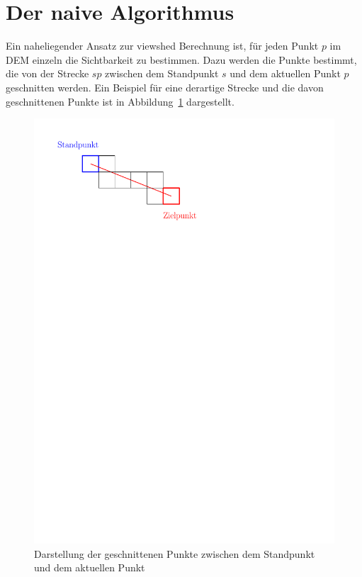 \section{Der naive Algorithmus}
Ein naheliegender Ansatz zur viewshed Berechnung ist, für jeden Punkt $p$ im DEM einzeln die Sichtbarkeit zu bestimmen. 
Dazu werden die Punkte bestimmt, die von der Strecke $sp$ zwischen dem Standpunkt $s$ und dem aktuellen Punkt $p$ geschnitten werden. Ein Beispiel für eine derartige Strecke und die davon geschnittenen Punkte ist in Abbildung~\ref{naive_p} dargestellt. 

\begin{figure}[!ht]
 \centering
 \includegraphics[scale=0.55]{../graphics/naive}
 \caption{Darstellung der geschnittenen Punkte zwischen dem Standpunkt und dem aktuellen Punkt}
 \label{naive_p}
\end{figure} 

